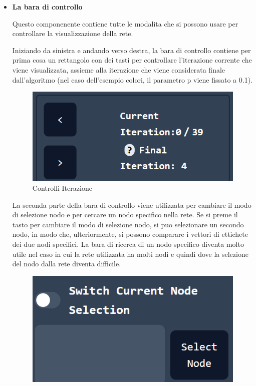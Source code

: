 \documentclass[a4paper,12pt]{report}
\begin{document}
			\begin{itemize}
			\item \textbf{La bara di controllo} 

			Questo componenente contiene tutte le modalita che si possono usare per controllare la visualizzazione della rete. 

			Iniziando da sinistra e andando verso destra, la bara di controllo contiene per prima cosa un rettangolo con dei tasti per controllare l'iterazione corrente che viene visualizzata, assieme alla iterazione che viene considerata finale dall'algoritmo (nel caso dell'esempio colori, il parametro p viene fissato a 0.1). \par
			\begin{center}
			\begin{figure}[H]
			\centering
			\includegraphics[width=0.9\linewidth,keepaspectratio]{iterationcontrol}
			\caption{Controlli Iterazione}
			\end{figure}
			\end{center}
			La seconda parte della bara di controllo viene utilizzata per cambiare il modo di selezione nodo e per cercare un nodo specifico nella rete. Se si preme il tasto per cambiare il modo di selezione nodo, si puo selezionare un secondo nodo, in modo che, ulteriormente, si possono comparare i vettori di ettichete dei due nodi specifici. La bara di ricerca di un nodo specifico diventa molto utile nel caso in cui la rete utilizzata ha molti nodi e quindi dove la selezione del nodo dalla rete diventa difficile. \par
			\begin{center}
			\begin{figure}[H]
			\centering
			\includegraphics[width=0.9\linewidth,keepaspectratio]{nodeselection}

\end{figure}
\end{center}
\end{itemize}
\end{document}
